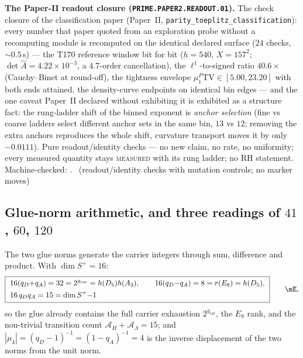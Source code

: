 \documentclass[11pt,a4paper]{article}
\newcommand{\gcar}{g_{\mathrm{car}}}
\newcommand{\AL}{\mathcal A_\Lambda}
\newcommand{\AH}{\mathcal A_H}
\theoremstyle{definition}
\begin{document}
\par\smallskip\noindent\textbf{The Paper-II readout closure
(\texttt{PRIME.PAPER2.READOUT.01}).}
The check closure of the classification paper (Paper~II,
\texttt{parity\_toeplitz\_classification}): every number that paper
quoted from an exploration probe without a recomputing module is
recomputed on the identical declared surface ($24$ checks,
${\sim}0.5$\,s) --- the T170 reference window bit for bit ($h=540$,
$X=157^{2}$; $\det\hat A=4.22\times10^{-3}$, a $4.7$-order
cancellation), the $\ell^{1}$-to-signed ratio $40.6\times$
(Cauchy--Binet at round-off), the tightness envelope
$\mu^{P}_{1}\mathrm{TV}\in[5.00,23.20]$ with both ends attained, the
density-curve endpoints on identical bin edges --- and the one caveat
Paper~II declared without exhibiting it is exhibited as a structure
fact: the rung-ladder shift of the binned exponent is \emph{anchor
selection} (fine vs coarse ladders select different anchor sets in
the same bin, $13$ vs $12$; removing the extra anchors reproduces the
whole shift, curvature transport moves it by only $-0.0111$). Pure
readout/identity checks --- no new claim, no rate, no uniformity; every
measured quantity stays \textsc{measured} with its rung ladder; no RH
statement.
Machine-checked:
.
\mE\ (readout/identity checks with mutation controls; no marker moves)

\subsection{Glue-norm arithmetic, and three readings of $41$, $60$, $120$}
The two glue norms generate the carrier integers through sum, difference and product. With
$\dim S^+=16$:
\begin{equation}
  \boxed{\ \begin{aligned}
    &16(q_D{+}q_A)=32=2^{\gcar}=h(D_5)h(A_3),\qquad 16(q_D{-}q_A)=8=r(E_8)=h(D_5),\\
    &16\,q_Dq_A=15=\dim S^+{-}1
  \end{aligned}\ }\qquad\mE ,
\end{equation}
so the glue already contains the full carrier exhaustion $2^{\gcar}$, the $E_8$ rank, and the
non-trivial transition count $\AH{+}\AL=15$; and $|\mu_4|=(q_D-1)^{-1}=(1-q_A)^{-1}=4$ is the inverse
displacement of the two norms from the unit norm.
\end{document}
